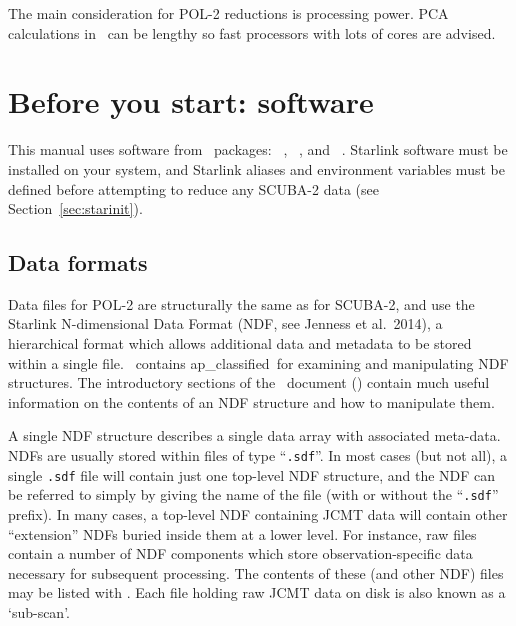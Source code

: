 The main consideration for POL-2 reductions is processing power. PCA calculations in
\makemap\ can be lengthy so fast processors with lots of cores are advised.


\section{Before you start: software}

This manual uses software from \starlink\ packages: \smurf\
\cite{smurf}, \Kappa\ \cite{kappa}, \polpack \cite{polpack} and \gaia\ \cite{gaia}.
Starlink software must be installed on your system, and Starlink
aliases and environment variables must be defined before attempting
to reduce any SCUBA-2 data (see Section~\ref{sec:starinit}).


\subsection{Data formats}
\label{sec:ndf}

Data files for POL-2 are structurally the same as for SCUBA-2, and use
the Starlink N-dimensional Data Format (NDF,
see Jenness et al.\ 2014\cite{ndf}), a hierarchical format which allows
additional data and metadata to be stored within a single file. \Kappa\
contains  {ap_classified}\ for examining and
manipulating NDF structures. The introductory sections of the \Kappa\
document () contain much useful information on
the contents of an NDF structure and how to manipulate them.

A single NDF structure describes a single data array with associated
meta-data. NDFs are usually stored within files of type ``\verb+.sdf+''.
In most cases (but not all), a single \verb+.sdf+ file will contain just
one top-level NDF structure, and the NDF can be referred to simply by
giving the name of the file (with or without the ``\verb+.sdf+'' prefix).
In many cases, a top-level NDF containing JCMT data will contain other
``extension'' NDFs buried inside them at a lower level. For instance, raw
files contain a number of NDF components which store observation-specific
data necessary for subsequent processing. The contents of these (and
other NDF) files may be listed with \HDSTRACEref. Each file holding raw
JCMT data on disk is also known as a `sub-scan'.

